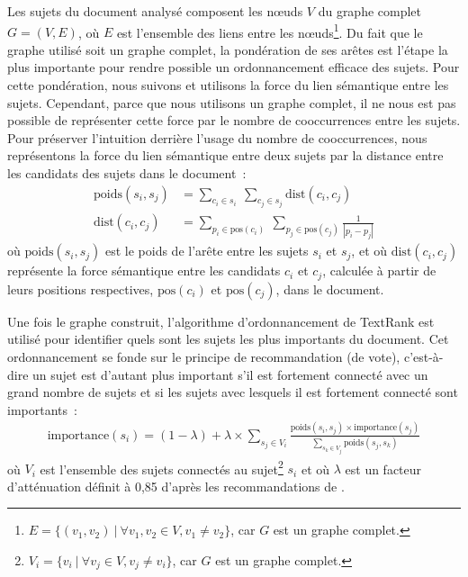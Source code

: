     Les sujets du document analysé composent les n\oe{}uds $V$ du graphe complet
    $G = (V, E)$, où $E$ est l'ensemble des liens entre les
    n\oe{}uds\footnote{$E = \{(v_1, v_2)\ |\ \forall{v_1, v_2 \in V}, v_1 \neq
    v_2\}$, car $G$ est un graphe complet.}. Du fait que le graphe utilisé soit
    un graphe complet, la pondération de ses arêtes est l'étape la plus
    importante pour rendre possible un ordonnancement efficace des sujets. Pour
    cette pondération, nous suivons  et utilisons la
    force du lien sémantique entre les sujets. Cependant, parce que nous
    utilisons un graphe complet, il ne nous est pas possible de représenter
    cette force par le nombre de cooccurrences entre les sujets. Pour préserver
    l'intuition derrière l'usage du nombre de cooccurrences, nous représentons
    la force du lien sémantique entre deux sujets par la distance entre les
    candidats des sujets dans le document~:
    \begin{align}
      \text{poids}(s_i, s_j) &= \sum_{c_i \in s_i}\ \sum_{c_j \in s_j} \text{dist}(c_i, c_j) \label{math:ponderation}\\
      \text{dist}(c_i, c_j) &= \sum_{p_i \in \text{pos}(c_i)}\ \sum_{p_j \in \text{pos}(c_j)} \frac{1}{|p_i - p_j|} \label{math:distance}
    \end{align}
    où $\text{poids}(s_i, s_j)$ est le poids de l'arête entre les sujets $s_i$
    et $s_j$, et où $\text{dist}(c_i, c_j)$ représente la force sémantique entre
    les candidats $c_i$ et $c_j$, calculée à partir de leurs positions
    respectives, $\text{pos}(c_i)$ et $\text{pos}(c_j)$, dans le document.

    Une fois le graphe construit, l'algorithme d'ordonnancement de TextRank est
    utilisé pour identifier quels sont les sujets les plus importants du
    document. Cet ordonnancement se fonde sur le principe de recommandation (de
    vote), c'est-à-dire un sujet est d'autant plus important s'il est fortement
    connecté avec un grand nombre de sujets et si les sujets avec lesquels il
    est fortement connecté sont importants~:
    \begin{align}
      \text{importance}(s_i) = (1 - \lambda) + \lambda \times \sum_{s_j \in V_i} \frac{\text{poids}(s_i, s_j) \times \text{importance}(s_j)}{\sum_{s_k \in V_j} \text{poids}(s_j, s_k)} \label{math:textrank}
    \end{align}
    où $V_i$ est l'ensemble des sujets connectés au
    sujet\footnote{$V_i = \{v_i\ |\ \forall{v_j \in V}, v_j \neq v_i\}$, car $G$
    est un graphe complet.} $s_i$ et où $\lambda$ est un facteur d'atténuation
    définit à 0,85 d'après les recommandations de .

